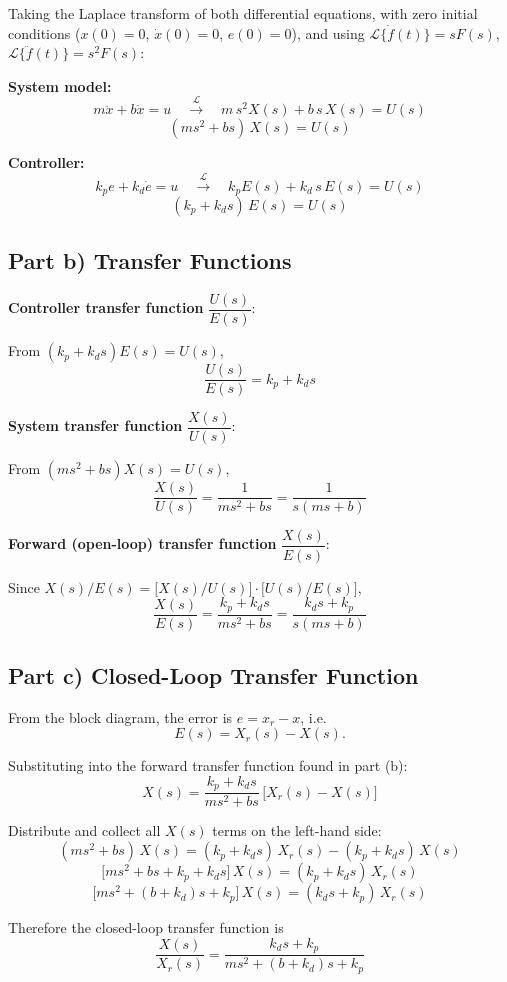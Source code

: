 \documentclass[12pt]{article}
\begin{document}
Taking the Laplace transform of both differential equations, with
zero initial conditions ($x(0)=0$, $\dot x(0)=0$, $e(0)=0$), and
using $\mathcal{L}\{\dot f(t)\} = sF(s)$, $\mathcal{L}\{\ddot
f(t)\} = s^2F(s)$:

\textbf{System model:}
\[
m\ddot{x}+b\dot{x}=u
\quad\xrightarrow{\;\mathcal{L}\;}\quad
m\,s^2 X(s) + b\,s\,X(s) = U(s)
\]
\[
\boxed{(ms^2+bs)\,X(s) = U(s)}
\]

\textbf{Controller:}
\[
k_p e + k_d \dot e = u
\quad\xrightarrow{\;\mathcal{L}\;}\quad
k_p E(s) + k_d\, s\, E(s) = U(s)
\]
\[
\boxed{(k_p+k_d s)\,E(s) = U(s)}
\]

\subsection{Part b) Transfer Functions}

\textbf{Controller transfer function} $\dfrac{U(s)}{E(s)}$:

From $(k_p+k_d s)E(s) = U(s)$,
\[
\boxed{\dfrac{U(s)}{E(s)} = k_p + k_d s}
\]

\textbf{System transfer function} $\dfrac{X(s)}{U(s)}$:

From $(ms^2+bs)X(s) = U(s)$,
\[
\boxed{\dfrac{X(s)}{U(s)} = \dfrac{1}{ms^2+bs} = \dfrac{1}{s(ms+b)}}
\]

\textbf{Forward (open-loop) transfer function} $\dfrac{X(s)}{E(s)}$:

Since $X(s)/E(s) = \big[X(s)/U(s)\big]\cdot\big[U(s)/E(s)\big]$,
\[
\boxed{\dfrac{X(s)}{E(s)} = \dfrac{k_p+k_d s}{ms^2+bs} = \dfrac{k_d s + k_p}{s(ms+b)}}
\]

\subsection{Part c) Closed-Loop Transfer Function}

From the block diagram, the error is $e = x_r - x$, i.e.
\[
E(s) = X_r(s) - X(s).
\]

Substituting into the forward transfer function found in part (b):
\[
X(s) = \dfrac{k_p+k_d s}{ms^2+bs}\,\big[X_r(s) - X(s)\big]
\]

Distribute and collect all $X(s)$ terms on the left-hand side:
\[
(ms^2+bs)\,X(s) = (k_p+k_d s)\,X_r(s) - (k_p+k_d s)\,X(s)
\]
\[
\big[ms^2+bs+k_p+k_d s\big]\,X(s) = (k_p+k_d s)\,X_r(s)
\]
\[
\big[ms^2+(b+k_d)s+k_p\big]\,X(s) = (k_d s+k_p)\,X_r(s)
\]

Therefore the closed-loop transfer function is
\[
\boxed{\dfrac{X(s)}{X_r(s)} = \dfrac{k_d s + k_p}{m s^2 + (b+k_d)s + k_p}}
\]
\end{document}
